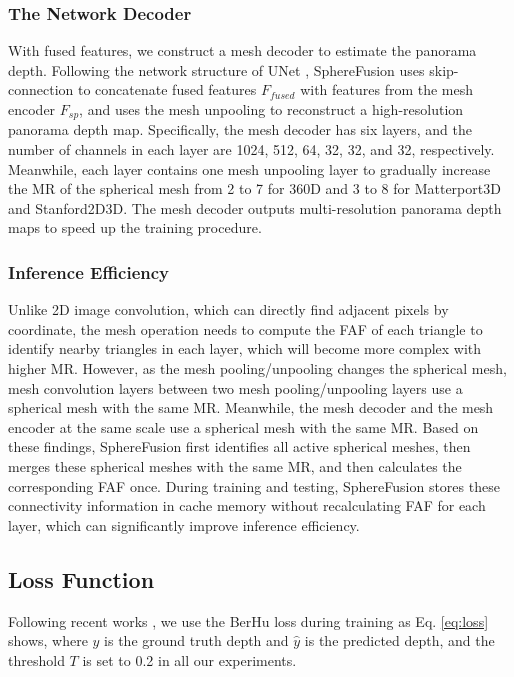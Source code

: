 \subsubsection{The Network Decoder}
With fused features, we construct a mesh decoder to estimate the panorama depth. 
Following the network structure of UNet \cite{ronneberger2015u}, SphereFusion uses skip-connection to concatenate fused features $F_{fused}$ with features from the mesh encoder $F_{sp}$, and uses the mesh unpooling to reconstruct a high-resolution panorama depth map. 
Specifically, the mesh decoder has six layers, and the number of channels in each layer are 1024, 512, 64, 32, 32, and 32, respectively. 
Meanwhile, each layer contains one mesh unpooling layer to gradually increase the MR of the spherical mesh from 2 to 7 for 360D and 3 to 8 for Matterport3D and Stanford2D3D. The mesh decoder outputs multi-resolution panorama depth maps to speed up the training procedure.





\subsubsection{Inference Efficiency}
Unlike 2D image convolution, which can directly find adjacent pixels by coordinate, the mesh operation needs to compute the FAF of each triangle to identify nearby triangles in each layer, which will become more complex with higher MR. 
However, as the mesh pooling/unpooling changes the spherical mesh, mesh convolution layers between two mesh pooling/unpooling layers use a spherical mesh with the same MR. 
Meanwhile, the mesh decoder and the mesh encoder at the same scale use a spherical mesh with the same MR. 
Based on these findings, SphereFusion first identifies all active spherical meshes, then merges these spherical meshes with the same MR, and then calculates the corresponding FAF once.
During training and testing, SphereFusion stores these connectivity information in cache memory without recalculating FAF for each layer, which can significantly improve inference efficiency. 



\subsection{Loss Function}
\label{sec:loss}

Following recent works \cite{pintore2021slicenet,wang2020bifuse}, we use the BerHu loss \cite{laina2016deeper} during training as Eq. \ref{eq:loss} shows, where $y$ is the ground truth depth and $\hat{y}$ is the predicted depth, and the threshold $T$ is set to 0.2 in all our experiments.

